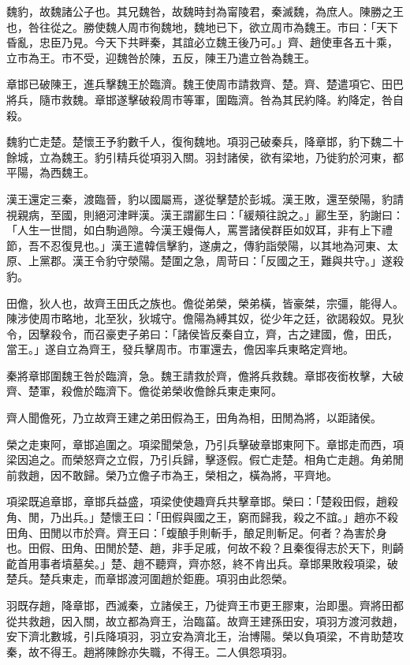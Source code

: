 
\begin{pinyinscope}
魏豹，故魏諸公子也。其兄魏咎，故魏時封為甯陵君，秦滅魏，為庶人。陳勝之王也，咎往從之。勝使魏人周市徇魏地，魏地已下，欲立周市為魏王。市曰：「天下昏亂，忠臣乃見。今天下共畔秦，其誼必立魏王後乃可。」齊、趙使車各五十乘，立市為王。市不受，迎魏咎於陳，五反，陳王乃遣立咎為魏王。

章邯已破陳王，進兵擊魏王於臨濟。魏王使周市請救齊、楚。齊、楚遣項它、田巴將兵，隨市救魏。章邯遂擊破殺周市等軍，圍臨濟。咎為其民約降。約降定，咎自殺。

魏豹亡走楚。楚懷王予豹數千人，復徇魏地。項羽己破秦兵，降章邯，豹下魏二十餘城，立為魏王。豹引精兵從項羽入關。羽封諸侯，欲有梁地，乃徙豹於河東，都平陽，為西魏王。

漢王還定三秦，渡臨晉，豹以國屬焉，遂從擊楚於彭城。漢王敗，還至滎陽，豹請視親病，至國，則絕河津畔漢。漢王謂酈生曰：「緩頰往說之。」酈生至，豹謝曰：「人生一世間，如白駒過隙。今漢王嫚侮人，罵詈諸侯群臣如奴耳，非有上下禮節，吾不忍復見也。」漢王遣韓信擊豹，遂虜之，傳豹詣滎陽，以其地為河東、太原、上黨郡。漢王令豹守滎陽。楚圍之急，周苛曰：「反國之王，難與共守。」遂殺豹。

田儋，狄人也，故齊王田氏之族也。儋從弟榮，榮弟橫，皆豪桀，宗彊，能得人。陳涉使周市略地，北至狄，狄城守。儋陽為縛其奴，從少年之廷，欲謁殺奴。見狄令，因擊殺令，而召豪吏子弟曰：「諸侯皆反秦自立，齊，古之建國，儋，田氏，當王。」遂自立為齊王，發兵擊周市。市軍還去，儋因率兵東略定齊地。

秦將章邯圍魏王咎於臨濟，急。魏王請救於齊，儋將兵救魏。章邯夜銜枚擊，大破齊、楚軍，殺儋於臨濟下。儋從弟榮收儋餘兵東走東阿。

齊人聞儋死，乃立故齊王建之弟田假為王，田角為相，田閒為將，以距諸侯。

榮之走東阿，章邯追圍之。項梁聞榮急，乃引兵擊破章邯東阿下。章邯走而西，項梁因追之。而榮怒齊之立假，乃引兵歸，擊逐假。假亡走楚。相角亡走趙。角弟閒前救趙，因不敢歸。榮乃立儋子市為王，榮相之，橫為將，平齊地。

項梁既追章邯，章邯兵益盛，項梁使使趣齊兵共擊章邯。榮曰：「楚殺田假，趙殺角、閒，乃出兵。」楚懷王曰：「田假與國之王，窮而歸我，殺之不誼。」趙亦不殺田角、田閒以市於齊。齊王曰：「蝮酿手則斬手，酿足則斬足。何者？為害於身也。田假、田角、田閒於楚、趙，非手足戚，何故不殺？且秦復得志於天下，則齮齕首用事者墳墓矣。」楚、趙不聽齊，齊亦怒，終不肯出兵。章邯果敗殺項梁，破楚兵。楚兵東走，而章邯渡河圍趙於鉅鹿。項羽由此怨榮。

羽既存趙，降章邯，西滅秦，立諸侯王，乃徙齊王市更王膠東，治即墨。齊將田都從共救趙，因入關，故立都為齊王，治臨菑。故齊王建孫田安，項羽方渡河救趙，安下濟北數城，引兵降項羽，羽立安為濟北王，治博陽。榮以負項梁，不肯助楚攻秦，故不得王。趙將陳餘亦失職，不得王。二人俱怨項羽。


\end{pinyinscope}
